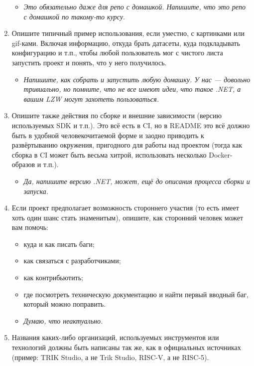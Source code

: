 \documentclass{../../text-style}
\begin{document}
\begin{enumerate}
    \begin{itemize}
        \item \emph{Это обязательно даже для репо с домашкой. Напишите, что это репо с домашкой по такому-то курсу.}
    \end{itemize}
    \item Опишите типичный пример использования, если уместно, с картинками или gif-ками. Включая информацию, откуда брать датасеты, куда подкладывать конфигурацию и т.п., чтобы любой пользователь мог с чистого листа запустить проект и понять, что у него получилось.
    \begin{itemize}
        \item \emph{Напишите, как собрать и запустить любую домашку. У нас --- довольно тривиально, но помните, что не все имеют идеи, что такое .NET, а вашим LZW могут захотеть пользоваться.}
    \end{itemize}
    \item Опишите также действия по сборке и внешние зависимости (версию используемых SDK и т.п.). Это всё есть в CI, но в README это всё должно быть в удобной человекочитаемой форме и заодно приводить к развёртыванию окружения, пригодного для работы над проектом (тогда как сборка в CI может быть весьма хитрой, использовать несколько Docker-образов и т.п.).
    \begin{itemize}
        \item \emph{Да, напишите версию .NET, может, ещё до описания процесса сборки и запуска.}
    \end{itemize}
    \item Если проект предполагает возможность стороннего участия (то есть имеет хоть один шанс стать знаменитым), опишите, как сторонний человек может вам помочь:
    \begin{itemize}
        \item куда и как писать баги;
        \item как связаться с разработчиками;
        \item как контрибьютить;
        \item где посмотреть техническую документацию и найти первый вводный баг, который можно поправить.
    \end{itemize}
    \begin{itemize}
        \item \emph{Думаю, что неактуально.}
    \end{itemize}
    \item Названия каких-либо организаций, используемых инструментов или технологий должны быть написаны так же, как в официальных источниках (пример: TRIK Studio, а не Trik Studio, RISC-V, а не RISC-5).

\end{enumerate}
\end{document}

